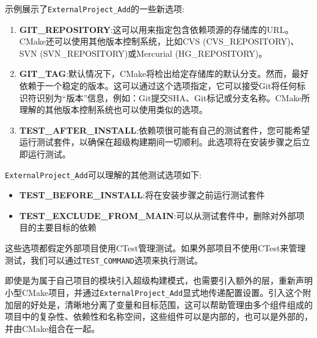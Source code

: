 
示例展示了\texttt{ExternalProject\_Add}的一些新选项:

\begin{enumerate}
\item \textbf{GIT\_REPOSITORY}:这可以用来指定包含依赖项源的存储库的URL。CMake还可以使用其他版本控制系统，比如CVS (CVS\_REPOSITORY)、SVN (SVN\_REPOSITORY)或Mercurial (HG\_REPOSITORY)。

\item \textbf{GIT\_TAG}:默认情况下，CMake将检出给定存储库的默认分支。然而，最好依赖于一个稳定的版本。这可以通过这个选项指定，它可以接受Git将任何标识符识别为“版本”信息，例如：Git提交SHA、Git标记或分支名称。CMake所理解的其他版本控制系统也可以使用类似的选项。

\item \textbf{TEST\_AFTER\_INSTALL}:依赖项很可能有自己的测试套件，您可能希望运行测试套件，以确保在超级构建期间一切顺利。此选项将在安装步骤之后立即运行测试。

\end{enumerate}

\texttt{ExternalProject\_Add}可以理解的其他测试选项如下:

\begin{itemize}
\item \textbf{TEST\_BEFORE\_INSTALL}:将在安装步骤之前运行测试套件

\item \textbf{TEST\_EXCLUDE\_FROM\_MAIN}:可以从测试套件中，删除对外部项目的主要目标的依赖

\end{itemize}

这些选项都假定外部项目使用CTest管理测试。如果外部项目不使用CTest来管理测试，我们可以通过\texttt{TEST\_COMMAND}选项来执行测试。

即使是为属于自己项目的模块引入超级构建模式，也需要引入额外的层，重新声明小型CMake项目，并通过\texttt{ExternalProject\_Add}显式地传递配置设置。引入这个附加层的好处是，清晰地分离了变量和目标范围，这可以帮助管理由多个组件组成的项目中的复杂性、依赖性和名称空间，这些组件可以是内部的，也可以是外部的，并由CMake组合在一起。


